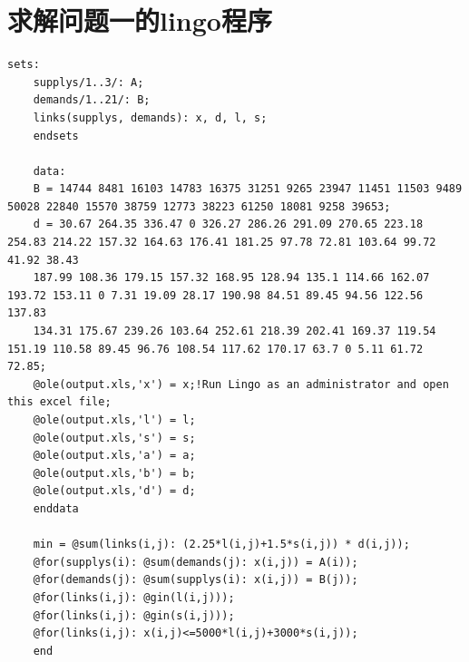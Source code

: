 \documentclass{article}
\begin{document}
	\section{求解问题一的lingo程序}
	\label{sec:corn_field_poj_3254_suan_fa_yuan_dai_ma_}
	\begin{lstlisting}[language=lingo]
	sets:
	supplys/1..3/: A;
	demands/1..21/: B;
	links(supplys, demands): x, d, l, s;
	endsets
	
	data:
	B = 14744 8481 16103 14783 16375 31251 9265 23947 11451 11503 9489 50028 22840 15570 38759 12773 38223 61250 18081 9258 39653;	
	d = 30.67 264.35 336.47 0 326.27 286.26 291.09 270.65 223.18 254.83 214.22 157.32 164.63 176.41 181.25 97.78 72.81 103.64 99.72 41.92 38.43 
	187.99 108.36 179.15 157.32 168.95 128.94 135.1 114.66 162.07 193.72 153.11 0 7.31 19.09 28.17 190.98 84.51 89.45 94.56 122.56 137.83 
	134.31 175.67 239.26 103.64 252.61 218.39 202.41 169.37 119.54 151.19 110.58 89.45 96.76 108.54 117.62 170.17 63.7 0 5.11 61.72 72.85;
	@ole(output.xls,'x') = x;!Run Lingo as an administrator and open this excel file;
	@ole(output.xls,'l') = l;
	@ole(output.xls,'s') = s;
	@ole(output.xls,'a') = a;
	@ole(output.xls,'b') = b;
	@ole(output.xls,'d') = d;
	enddata
	
	min = @sum(links(i,j): (2.25*l(i,j)+1.5*s(i,j)) * d(i,j));
	@for(supplys(i): @sum(demands(j): x(i,j)) = A(i));
	@for(demands(j): @sum(supplys(i): x(i,j)) = B(j));
	@for(links(i,j): @gin(l(i,j)));
	@for(links(i,j): @gin(s(i,j)));
	@for(links(i,j): x(i,j)<=5000*l(i,j)+3000*s(i,j));
	end
	\end{lstlisting}
\end{document}
